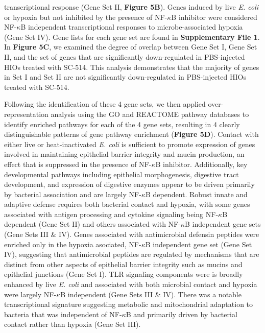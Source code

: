 \documentclass[9pt,lineo]{elife}
\begin{document}
transcriptional response (Gene Set II, \textbf{Figure 5B}). Genes induced by live \emph{E. coli} or hypoxia but not inhibited by the presence of NF-\(\kappa\)B inhibitor were considered NF-\(\kappa\)B independent transcriptional responses to microbe-associated hypoxia (Gene Set IV). Gene lists for each gene set are found in \textbf{Supplementary File 1}. In \textbf{Figure 5C}, we examined the degree of overlap between Gene Set I, Gene Set II, and the set of genes that are significantly down-regulated in PBS-injected HIOs treated with SC-514. This analysis demonstrates that the majority of genes in Set I and Set II are not significantly down-regulated in PBS-injected HIOs treated with SC-514. 

Following the identification of these 4 gene sets, we then applied over-representation analysis using the GO and REACTOME pathway databases to identify enriched pathways for each of the 4 gene sets, resulting in 4 clearly distinguishable patterns of gene pathway enrichment (\textbf{Figure 5D}). Contact with either live or heat-inactivated \emph{E. coli} is sufficient to promote expression of genes involved in maintaining epithelial barrier integrity and mucin production, an effect that is suppressed in the presence of NF-\(\kappa\)B inhibitor. Additionally, key developmental pathways including epithelial morphogenesis, digestive tract development, and expression of digestive enzymes appear to be driven primarily by bacterial association and are largely NF-\(\kappa\)B dependent. Robust innate and adaptive defense requires both bacterial contact and hypoxia, with some genes associated with antigen processing and cytokine signaling being NF-\(\kappa\)B dependent (Gene Set II) and others associated with NF-\(\kappa\)B independent gene sets (Gene Sets III \& IV). Genes associated with antimicrobial defensin peptides were enriched only in the hypoxia asociated, NF-\(\kappa\)B independent gene set (Gene Set IV), suggesting that antimicrobial peptides are regulated by mechanisms that are distinct from other aspects of epithelial barrier integrity such as mucins and epithelial junctions (Gene Set I). TLR signaling components were is broadly enhanced by live \emph{E. coli} and associated with both microbial contact and hypoxia were largely NF-\(\kappa\)B independent (Gene Sets III \& IV). There was a notable transcriptional signature suggesting metabolic and mitochondrial adaptation to bacteria that was independent of NF-\(\kappa\)B and primarily driven by bacterial contact rather than hypoxia (Gene Set III).
\end{document}
